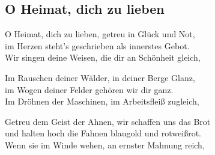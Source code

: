 
\subsection*{O Heimat, dich zu lieben}
%
%

\thestrophe O Heimat, dich zu lieben, getreu in Glück und Not, \\
im Herzen steht's geschrieben als innerstes Gebot. \\
Wir singen deine Weisen, die dir an Schönheit gleich, \\

\thestrophe Im Rauschen deiner Wälder, in deiner Berge Glanz, \\
im Wogen deiner Felder gehören wir dir ganz. \\
Im Dröhnen der Maschinen, im Arbeitsfleiß zugleich, \\

\thestrophe Getreu dem Geist der Ahnen, wir schaffen uns das Brot \\
und halten hoch die Fahnen blaugold und rotweißrot. \\
Wenn sie im Winde wehen, an ernster Mahnung reich, \\
